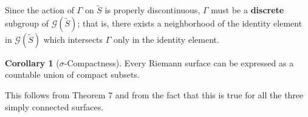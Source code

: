 \documentclass{article}
\theoremstyle{definition}
\newtheorem{corollary}{Corollary}
\begin{document}
    Since the action of $\Gamma$ on $\tilde{S}$ is properly discontinuous, $\Gamma$ must be a \textbf{discrete} subgroup of
    $\mathcal{G}(\tilde{S})$; that is, there exists a neighborhood of the identity element in $\mathcal{G}(\tilde{S})$ which
    intersects $\Gamma$ only in the identity element.

    \begin{corollary}[$\sigma$-Compactness]
        Every Riemann surface can be expressed as a countable union of compact subsets.
    \end{corollary}

    This follows from Theorem 7 and from the fact that this is true for all the three simply connected surfaces.
    
\end{document}
